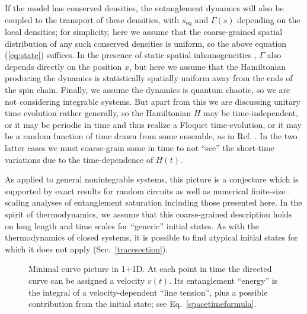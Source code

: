 \documentclass[aps,prx,twocolumn,superscriptaddress,floatfix,nofootinbib,prx]{revtex4}
\renewcommand{\>}{\right\rangle}
\newcommand{\<}{\left\langle}
\newcommand{\seq}{s_\text{eq}}
\begin{document}
If the model has conserved densities, the entanglement dynamics will also be coupled to the transport of these densities, with $\seq$ and $\Gamma(s)$ depending on the local densities; for simplicity, here we assume that the coarse-grained spatial distribution of any such conserved densities is uniform, so the above equation (\ref{eq:state}) suffices.  In the presence of static spatial inhomogeneities \cite{nahum2},  $\Gamma$ also depends directly on the position $x$, but here we assume that the Hamiltonian  producing the dynamics is statistically spatially uniform away from the ends of the spin chain.  Finally, we  assume the dynamics is quantum chaotic, so we are not considering  integrable systems.  But apart from this we are discussing unitary time evolution rather generally, so the Hamiltonian $H$ may be time-independent, or it may be periodic in time and thus realize a Floquet time-evolution, or it may be a random function of time drawn from some ensemble, as in Ref. .  In the two latter cases we must coarse-grain some in time to not ``see'' the short-time variations due to the time-dependence of $H(t)$. 

As applied to general nonintegrable systems, this picture is a conjecture which is supported by exact results for random circuits as well as numerical finite-size scaling analyses of entanglement saturation \cite{nahum,nahum2} including those presented here. In the spirit of thermodynamics, we assume that this coarse-grained description holds  on long length and time scales for ``generic'' initial states.  As with the thermodynamics of closed systems, it is possible to find atypical initial states for which it does not apply (Sec.~\ref{tracesection}).


\begin{figure}[t]
\caption{
Minimal curve picture in 1+1D.  At each point in time the directed curve can be assigned a velocity $v(t)$.  Its entanglement ``energy'' is the integral of a velocity-dependent ``line tension'', plus a possible contribution from the initial state; see Eq.~\ref{spacetimeformula}.
}  \label{fig:minimalcurve}
\end{figure}
\end{document}
